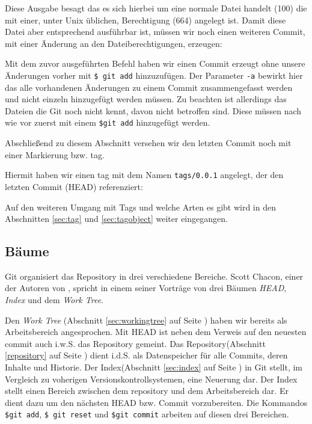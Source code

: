 

Diese Ausgabe besagt das es sich hierbei um eine normale Datei handelt (100)
die mit einer, unter Unix üblichen, Berechtigung (664) angelegt ist. Damit
diese Datei aber entsprechend ausführbar ist, müssen wir noch einen weiteren
Commit, mit einer Änderung an den Dateiberechtigungen, erzeugen:



Mit dem zuvor ausgeführten Befehl haben wir einen Commit erzeugt ohne unsere
Änderungen vorher mit \texttt{\$ git add} hinzuzufügen. Der Parameter
\texttt{-a} bewirkt hier das alle vorhandenen Änderungen zu einem Commit
zusammengefasst werden und nicht einzeln hinzugefügt werden müssen. Zu beachten
ist allerdings das Dateien die Git noch nicht kennt, davon nicht betroffen
sind. Diese müssen nach wie vor zuerst mit einem \texttt{\$git add} hinzugefügt
werden.

Abschließend zu diesem Abschnitt versehen wir den letzten Commit noch mit einer
Markierung bzw. \gls{tag}.



Hiermit haben wir einen \gls{tag} mit dem Namen \texttt{tags/0.0.1} angelegt,
der den letzten Commit (\gls{HEAD}) referenziert:



Auf den weiteren Umgang mit Tags und welche Arten es gibt wird in den
Abschnitten \ref{sec:tag} und \ref{sec:tagobject} weiter eingegangen.

\subsection{Bäume}\label{sec:trees}
Git organisiert das Repository in drei verschiedene Bereiche. Scott Chacon,
einer der Autoren von \cite{progit}, spricht in einem seiner
Vorträge\cite{link:talesoftrees} von drei Bäumen \textit{HEAD}, \textit{Index}
und dem \textit{Work Tree}.

Den \textit{Work Tree} (Abschnitt \ref{sec:workingtree} auf Seite
\pageref{sec:workingtree}) haben wir bereits als Arbeitsbereich angesprochen.
Mit \gls{HEAD} ist neben dem Verweis auf den neuesten commit auch i.w.S. das
Repository gemeint.  Das Repository(Abschnitt \ref{repository} auf Seite
\pageref{repository}) dient i.d.S. als Datenspeicher für alle Commits, deren
Inhalte und Historie. Der Index(Abschnitt \ref{sec:index} auf Seite
\pageref{sec:index}) in Git stellt, im Vergleich zu voherigen
Versionskontrollsystemen, eine Neuerung dar. Der Index stellt einen Bereich
zwischen dem \gls{repository} und dem Arbeitsbereich dar. Er dient dazu um den
nächsten \gls{HEAD} bzw. Commit vorzubereiten. Die Kommandos \texttt{\$git
add}, \texttt{\$ git reset} und \texttt{\$git commit} arbeiten auf diesen drei
Bereichen.\cite[34-35]{gitosp}

